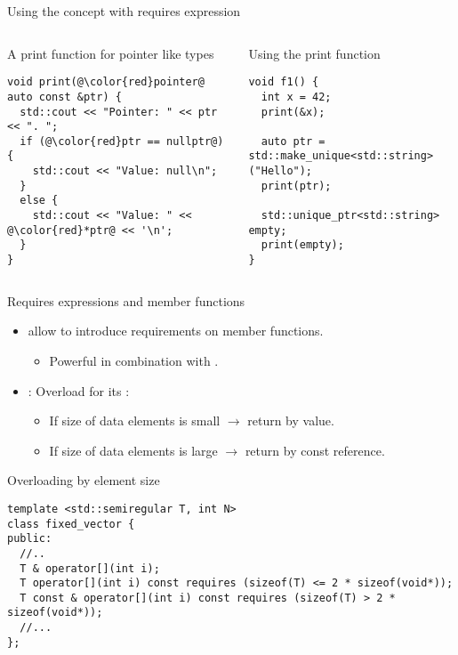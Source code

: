 \begin{frame}[t,fragile]{Using the concept with requires expression}

\begin{columns}[T]

\begin{block}{A print function for pointer like types}
\begin{lstlisting}[escapechar=@]
void print(@\color{red}pointer@ auto const &ptr) {
  std::cout << "Pointer: " << ptr << ". ";
  if (@\color{red}ptr == nullptr@) {
    std::cout << "Value: null\n";
  }
  else {
    std::cout << "Value: " << @\color{red}*ptr@ << '\n';
  }
}

\end{lstlisting}
\end{block}

\pause
{}
\begin{block}{Using the print function}
\begin{lstlisting}
void f1() {
  int x = 42;
  print(&x);

  auto ptr = std::make_unique<std::string>("Hello");
  print(ptr);

  std::unique_ptr<std::string> empty;
  print(empty);
}

\end{lstlisting}
\end{block}

\end{columns}
\end{frame}


\begin{frame}[t,fragile]{Requires expressions and member functions}
\begin{itemize}
  \item {} allow to introduce requirements on
        member functions.
    \begin{itemize}
      \item Powerful in combination with .
    \end{itemize}

  \item {}: Overload  for 
        its :
    \begin{itemize}
      \item If size of data elements is small $\rightarrow$ return by value.
      \item If size of data elements is large $\rightarrow$ return by const reference.
    \end{itemize}
\end{itemize}

\pause
\begin{block}{Overloading by element size}
\begin{lstlisting}
template <std::semiregular T, int N>
class fixed_vector {
public:
  //..
  T & operator[](int i);
  T operator[](int i) const requires (sizeof(T) <= 2 * sizeof(void*));
  T const & operator[](int i) const requires (sizeof(T) > 2 * sizeof(void*));
  //...
};
\end{lstlisting}
\end{block}
\end{frame}
